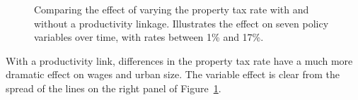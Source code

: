 \begin{figure}[h!tb]
       \caption[Varying the property tax rate with and without  linkage]{Comparing the effect of varying the property tax rate with and without a productivity linkage. Illustrates the effect on seven policy variables over time, with rates between 1\% and 17\%.}
    \label{fig:Productivity_link_W-WO-property_tax}
\end{figure}
With a productivity link, differences in the property tax rate have a much more dramatic effect on wages and urban size. The variable effect is clear from the spread of the lines on the right panel of Figure~\ref{fig:Productivity_link_W-WO-property_tax}.   %




